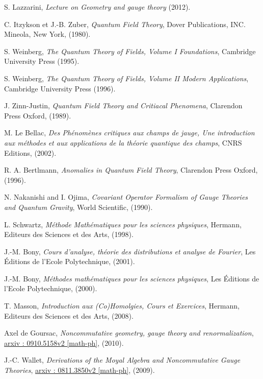 \documentclass[a4paper,11pt]{article} %
\theoremstyle{plain}
\theoremstyle{definition}
\theoremstyle{remark}
\numberwithin{equation}{section}
\numberwithin{equation}{subsection}
\numberwithin{figure}{section}
\begin{document}
\begin{thebibliography}{99}
 
S. Lazzarini, \emph{Lecture on Geometry and gauge theory} (2012).



C. Itzykson et J.-B. Zuber, \emph{Quantum Field Theory}, Dover Publications, INC. Mineola, New York, (1980).

S. Weinberg, \emph{The Quantum Theory of Fields, Volume I Foundations}, Cambridge University Press (1995).

S. Weinberg, \emph{The Quantum Theory of Fields, Volume II Modern Applications}, Cambridge University Press (1996).

J. Zinn-Justin, \emph{Quantum Field Theory and Critiacal Phenomena}, Clarendon Press Oxford, (1989).

M. Le Bellac, \emph{Des Phénomènes critiques aux champs de jauge, Une introduction aux méthodes et aux applications de la théorie quantique des champs}, CNRS Editions, (2002).

R. A. Bertlmann, \emph{Anomalies in Quantum Field Theory}, Clarendon Press Oxford, (1996).

N. Nakanishi and I. Ojima, \emph{Covariant Operator Formalism of Gauge Theories and Quantum Gravity}, World Scientific, (1990).

L. Schwartz, \emph{Méthode Mathématiques pour les sciences physiques}, Hermann, Editeurs des Sciences et des Arts, (1998).

J.-M. Bony, \emph{Cours d'analyse, théorie des distributions et analyse de Fourier}, Les Éditions de l'Ecole Polytechnique, (2001).

J.-M. Bony, \emph{Méthodes mathématiques pour les sciences physiques}, Les Éditions de l'Ecole Polytechnique, (2000).

T. Masson, \emph{Introduction aux (Co)Homolgies, Cours et Exercices}, Hermann, Editeurs des Sciences et des Arts, (2008).

Axel de Goursac, \emph{Noncommutative geometry, gauge theory and renormalization}, \href{http://arxiv.org/abs/0910.5158}{arxiv : 0910.5158v2 [math-ph]}, (2010).

J.-C. Wallet, \emph{Derivations of the Moyal Algebra and Noncommutative Gauge Theories}, \href{http://arxiv.org/abs/0811.3850}{arxiv : 0811.3850v2 [math-ph]}, (2009).

\end{thebibliography}
\end{document}
